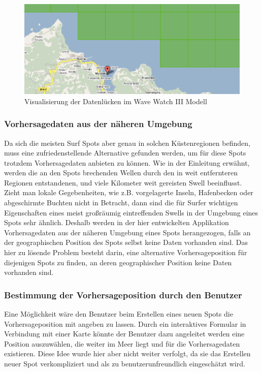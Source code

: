 \begin{figure}[h]
  \begin{center}
    \includegraphics[width=\textwidth]{bilder/locate-position}
    \caption{Visualisierung der Datenlücken im Wave Watch III Modell}
    \label{positions-bestimmung}
  \end{center}
\end{figure}

\subsubsection{Vorhersagedaten aus der näheren Umgebung}
Da sich die meisten Surf Spots aber genau in solchen Küstenregionen
befinden, muss eine zufriedenstellende Alternative gefunden werden, um
für diese Spots trotzdem Vorhersagedaten anbieten zu können. Wie in
der Einleitung erwähnt, werden die an den Spots brechenden Wellen
durch den in weit entfernteren Regionen entstandenen, und viele
Kilometer weit gereisten Swell beeinflusst. Zieht man lokale
Gegebenheiten, wie z.B. vorgelagerte Inseln, Hafenbecken oder
abgeschirmte Buchten nicht in Betracht, dann sind die für Surfer
wichtigen Eigenschaften eines meist großräumig eintreffenden Swells in
der Umgebung eines Spots sehr ähnlich. Deshalb werden in der hier
entwickelten Applikation Vorhersagedaten aus der näheren Umgebung
eines Spots herangezogen, falls an der geographischen Position des
Spots selbst keine Daten vorhanden sind. Das hier zu lösende Problem
besteht darin, eine alternative Vorhersageposition für diejenigen
Spots zu finden, an deren geographischer Position keine Daten
vorhanden sind.

\subsubsection{Bestimmung der Vorhersageposition durch den Benutzer}
Eine Möglichkeit wäre den Benutzer beim Erstellen eines neuen Spots
die Vorhersageposition mit angeben zu lassen. Durch ein interaktives
Formular in Verbindung mit einer Karte könnte der Benutzer dazu
angeleitet werden eine Position auszuwählen, die weiter im Meer liegt
und für die Vorhersagedaten existieren. Diese Idee wurde hier aber
nicht weiter verfolgt, da sie das Erstellen neuer Spot verkompliziert
und als zu benutzerunfreundlich eingeschätzt wird.

